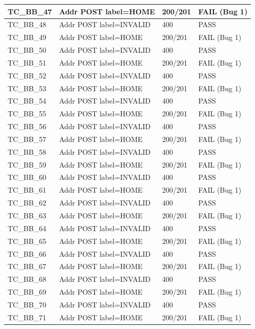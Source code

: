 \documentclass{article}
\begin{document}
\begin{longtable}{|p{2cm}|p{8cm}|p{3cm}|p{2cm}|}
\hline
TC\_BB\_47 & Addr POST label=HOME & 200/201 & FAIL (Bug 1) \\
\hline
TC\_BB\_48 & Addr POST label=INVALID & 400 & PASS \\
\hline
TC\_BB\_49 & Addr POST label=HOME & 200/201 & FAIL (Bug 1) \\
\hline
TC\_BB\_50 & Addr POST label=INVALID & 400 & PASS \\
\hline
TC\_BB\_51 & Addr POST label=HOME & 200/201 & FAIL (Bug 1) \\
\hline
TC\_BB\_52 & Addr POST label=INVALID & 400 & PASS \\
\hline
TC\_BB\_53 & Addr POST label=HOME & 200/201 & FAIL (Bug 1) \\
\hline
TC\_BB\_54 & Addr POST label=INVALID & 400 & PASS \\
\hline
TC\_BB\_55 & Addr POST label=HOME & 200/201 & FAIL (Bug 1) \\
\hline
TC\_BB\_56 & Addr POST label=INVALID & 400 & PASS \\
\hline
TC\_BB\_57 & Addr POST label=HOME & 200/201 & FAIL (Bug 1) \\
\hline
TC\_BB\_58 & Addr POST label=INVALID & 400 & PASS \\
\hline
TC\_BB\_59 & Addr POST label=HOME & 200/201 & FAIL (Bug 1) \\
\hline
TC\_BB\_60 & Addr POST label=INVALID & 400 & PASS \\
\hline
TC\_BB\_61 & Addr POST label=HOME & 200/201 & FAIL (Bug 1) \\
\hline
TC\_BB\_62 & Addr POST label=INVALID & 400 & PASS \\
\hline
TC\_BB\_63 & Addr POST label=HOME & 200/201 & FAIL (Bug 1) \\
\hline
TC\_BB\_64 & Addr POST label=INVALID & 400 & PASS \\
\hline
TC\_BB\_65 & Addr POST label=HOME & 200/201 & FAIL (Bug 1) \\
\hline
TC\_BB\_66 & Addr POST label=INVALID & 400 & PASS \\
\hline
TC\_BB\_67 & Addr POST label=HOME & 200/201 & FAIL (Bug 1) \\
\hline
TC\_BB\_68 & Addr POST label=INVALID & 400 & PASS \\
\hline
TC\_BB\_69 & Addr POST label=HOME & 200/201 & FAIL (Bug 1) \\
\hline
TC\_BB\_70 & Addr POST label=INVALID & 400 & PASS \\
\hline
TC\_BB\_71 & Addr POST label=HOME & 200/201 & FAIL (Bug 1) \\

\end{longtable}
\end{document}
